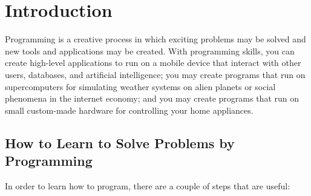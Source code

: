 \chapter{Introduction}
\label{chap:introduction}
Programming is a creative process in which exciting problems may be solved and new tools and applications may be created. With programming skills, you can create high-level applications to run on a mobile device that interact with other users, databases, and artificial intelligence; you may create programs that run on supercomputers for simulating weather systems on alien planets or social phenomena in the internet economy; and you may create programs that run on small custom-made hardware for controlling your home appliances. 

\section{How to Learn to Solve Problems by Programming}
In order to learn how to program, there are a couple of steps that are useful:
